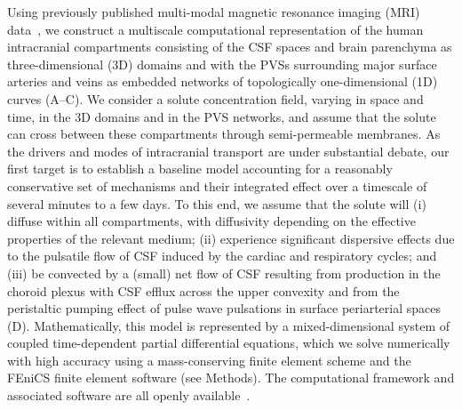 \documentclass[fleqn,10pt]{wlscirep}
\begin{document}
Using previously published multi-modal magnetic resonance imaging
(MRI) data~\cite{hodneland2019new, deistung2009tof,
  schweser2012quantitative, reichenbach2012future,
  deistung2017overview}, we construct a multiscale computational
representation of the human intracranial compartments consisting of
the CSF spaces and brain parenchyma as three-dimensional (3D) domains
and with the PVSs surrounding major surface arteries and veins as
embedded networks of topologically one-dimensional (1D) curves
(A--C). We consider a solute concentration field,
varying in space and time, in the 3D domains and in the PVS networks,
and assume that the solute can cross between these compartments
through semi-permeable membranes. As the drivers and modes of
intracranial transport are under substantial
debate\cite{smith2019going, proulx2021cerebrospinal,
  bohr2022glymphatic, hladky2022glymphatic, betsholtz2024advances},
our first target is to establish a baseline model accounting for a
reasonably conservative set of mechanisms and their integrated effect
over a timescale of several minutes to a few days. To this end, we
assume that the solute will (i) diffuse within all compartments, with
diffusivity depending on the effective properties of the relevant
medium\cite{sykova2008diffusion}; (ii) experience significant
dispersive effects due to the pulsatile flow of CSF induced by the
cardiac and respiratory cycles\cite{vinje2019respiratory,
  sharp2019dispersion, ray2021quantitative, troyetsky2021dispersion};
and (iii) be convected by a (small) net flow of CSF resulting from
production in the choroid plexus with CSF efflux across the upper
convexity\cite{hornkjol2022csf} and from the peristaltic pumping
effect of pulse wave pulsations in surface periarterial
spaces~\cite{mestre2018flow, gjerde2023directional}
(D). Mathematically, this model is represented by a
mixed-dimensional system of coupled time-dependent partial
differential equations\cite{masri2024modelling}, which we solve
numerically with high accuracy using a mass-conserving finite element
scheme and the FEniCS finite element software\cite{alnaes2015fenics,
  kuchta2020assembly} (see Methods). The computational framework and
associated software are all openly available~\cite{ZENODO}.
\end{document}
